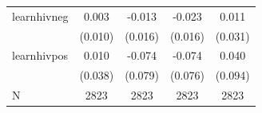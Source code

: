 \begin{tabular}{lcccc}
\hline
learnhivneg & 0.003 & -0.013 & -0.023 & 0.011 \\
 & (0.010) & (0.016) & (0.016) & (0.031) \\
learnhivpos & 0.010 & -0.074 & -0.074 & 0.040 \\
 & (0.038) & (0.079) & (0.076) & (0.094) \\
\hline
N & 2823 & 2823 & 2823 & 2823 \\
\hline
\end{tabular}
